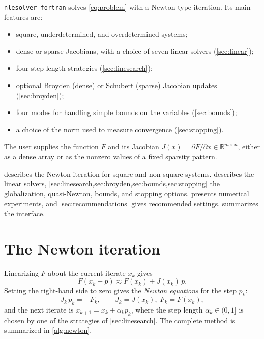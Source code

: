\documentclass[11pt]{article}
\newcommand{\R}{\mathbb{R}}
\newcommand{\code}[1]{\texttt{#1}}
\begin{document}
\code{nlesolver-fortran} solves \cref{eq:problem} with a Newton-type iteration. Its main features are:
\begin{itemize}
  \item square, underdetermined, and overdetermined systems;
  \item dense or sparse Jacobians, with a choice of seven linear solvers (\cref{sec:linear});
  \item four step-length strategies (\cref{sec:linesearch});
  \item optional Broyden (dense) or Schubert (sparse) Jacobian updates (\cref{sec:broyden});
  \item four modes for handling simple bounds on the variables (\cref{sec:bounds});
  \item a choice of the norm used to measure convergence (\cref{sec:stopping}).
\end{itemize}
The user supplies the function $F$ and its Jacobian
$J(x) = \partial F / \partial x \in \R^{m \times n}$, either as a dense array or as the nonzero
values of a fixed sparsity pattern.

 describes the Newton iteration for square and non-square systems.
 describes the linear solvers, \cref{sec:linesearch,sec:broyden,sec:bounds,sec:stopping}
the globalization, quasi-Newton, bounds, and stopping options.
 presents numerical experiments, and \cref{sec:recommendations} gives
recommended settings.  summarizes the interface.

\section{The Newton iteration}
\label{sec:newton}

Linearizing $F$ about the current iterate $x_k$ gives
\begin{equation}
  F(x_k + p) \approx F(x_k) + J(x_k)\, p .
\end{equation}
Setting the right-hand side to zero gives the \emph{Newton equations} for the step $p_k$:
\begin{equation}
  J_k\, p_k = -F_k, \qquad J_k = J(x_k),\; F_k = F(x_k),
  \label{eq:newton}
\end{equation}
and the next iterate is $x_{k+1} = x_k + \alpha_k p_k$, where the step length
$\alpha_k \in (0,1]$ is chosen by one of the strategies of \cref{sec:linesearch}.
The complete method is summarized in \cref{alg:newton}.
\end{document}
